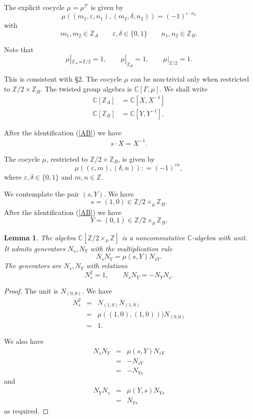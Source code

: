 \documentclass[11pt]{amsart}
\newtheorem{lemma}[theorem]{Lemma}
\theoremstyle{remark}
\theoremstyle{definition}
\newcommand{\Z}{\mathbb{Z}}
\newcommand{\C}{\mathbb{C}}
\begin{document}
The explicit cocycle $\mu = \mu^{\mathcal{T}}$ is given by
\[
\boxed{
\mu((m_1, \varepsilon, n_1), (m_2, \delta, n_2)) = (-1)^{\varepsilon \cdot n_2}
}
\]
with
 \[
 m_1, m_2 \in \Z_A \quad \quad \varepsilon, \delta \in \{0,1\}  \quad \quad n_1, n_2 \in \Z_B. 
 \] 

Note that 
\[
\mu |_{\Z_A \rtimes \Z/2} = 1,  \qquad \mu |_{\Z_B} = 1, \qquad \mu | _ {\Z/2} = 1.
\]




This is consistent with \S2.    The cocycle $\mu$ can be non-trivial  only when restricted to $\Z/2 \times \Z_B$.   
The twisted group algebra is $\C[\Gamma,\mu]$.   We shall write
\begin{align}\label{AB}
\C[\Z_A] &= \C[X, X^{-1}] \\
\C[\Z_B] &= \C[Y, Y^{-1}].
\end{align}

After the identification  (\ref{AB}) we have 
\begin{eqnarray}
s \cdot X = X^{-1}.   
\end{eqnarray}

The cocycle $\mu$, restricted to $\Z/2 \times \Z_B$,  is given by 
\[
\boxed{
\mu((\varepsilon, m), (\delta, n)): = (-1)^{\varepsilon n},
}
\] 
where $\varepsilon, \delta \in \{0,1\}$ and $m,n \in \Z$.     

We contemplate the pair $(s,Y)$.  We have 
\[
s = (1,0) \in \Z/2 \times_\mu \Z_B.
\]
   After the identification (\ref{AB}) we have 
   \[
   Y = (0,1) \in \Z/2 \times_\mu \Z_B.
   \]
   
   \begin{lemma}\label{sY} The algebra $\C[\Z/2 \times_\mu \Z]$ is a noncommutative $\C$-algebra with unit.   It admits generators $N_s, N_Y$ with the multiplication rule 
\[
N_s N_Y = \mu(s,Y)N_{sY}.
\]
The generators are $N_s, N_Y$ with relations
\[
N_s^2 = 1, \quad \quad N_sN_Y = - N_YN_s.
\]
   \end{lemma}
   
   \begin{proof}   The unit is $N_{(0,0)}$.   We have 
   \begin{eqnarray*}
   N_s^2 &=& N_{(1,0)}N_{(1,0)}\\
   & = &\mu((1,0),(1,0)))N_{(0,0)}\\
   & = &1.
   \end{eqnarray*}
   
   We also have
   \begin{eqnarray*}
   N_sN_Y &=& \mu(s,Y)N_{sY}\\
   &=& - N_{sY}\\
   &=& - N_{Ys}
   \end{eqnarray*}
   and
   \begin{eqnarray*}
   N_YN_s &=& \mu(Y,s)N_{Ys}\\
   &= & N_{Ys}
   \end{eqnarray*}
   as required.   
   \end{proof}
   
\end{document}
